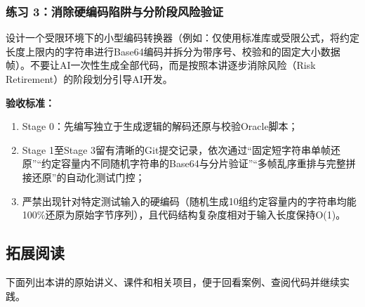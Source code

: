 \documentclass[UTF8,a4paper,11pt,fontset=fandol]{ctexart}
\begin{document}
\subsubsection*{练习 3：消除硬编码陷阱与分阶段风险验证}

设计一个受限环境下的小型编码转换器（例如：仅使用标准库或受限公式，将约定长度上限内的字符串进行Base64编码并拆分为带序号、校验和的固定大小数据帧）。不要让AI一次性生成全部代码，而是按照本讲逐步消除风险（Risk Retirement）的阶段划分引导AI开发。

\par{}\textbf{验收标准：}

\begin{enumerate}
\item Stage 0：先编写独立于生成逻辑的解码还原与校验Oracle脚本；

\item Stage 1至Stage 3留有清晰的Git提交记录，依次通过“固定短字符串单帧还原”“约定容量内不同随机字符串的Base64与分片验证”“多帧乱序重排与完整拼接还原”的自动化测试门控；

\item 严禁出现针对特定测试输入的硬编码（随机生成10组约定容量内的字符串均能100\%还原为原始字节序列），且代码结构复杂度相对于输入长度保持O(1)。
\end{enumerate}

\subsection{拓展阅读}

下面列出本讲的原始讲义、课件和相关项目，便于回看案例、查阅代码并继续实践。
\end{document}
